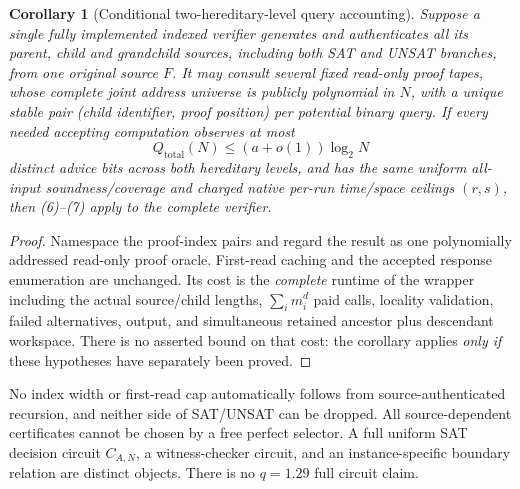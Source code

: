 \documentclass[11pt]{article}
\newtheorem{corollary}[theorem]{Corollary}
\begin{document}
\begin{corollary}[Conditional two-hereditary-level query accounting]
Suppose a \emph{single fully implemented} indexed
verifier generates and authenticates all its parent,
child and grandchild sources, including both SAT and
UNSAT branches, from one original source $F$.
It may consult several fixed read-only proof tapes,
whose \emph{complete joint address universe is
publicly polynomial in $N$}, with a unique stable
pair (child identifier, proof position) per
potential binary query. If every needed accepting
computation observes at most
\[
 Q_{\mathrm{total}}(N)\le(a+o(1))\log_2N
\]
\emph{distinct} advice bits \emph{across both
hereditary levels}, and has the same uniform all-input
soundness/coverage and charged native per-run
time/space ceilings $(r,s)$, then (6)--(7)
apply to the complete verifier.
\end{corollary}
\begin{proof}
Namespace the proof-index pairs and regard the
result as one polynomially addressed read-only
proof oracle. First-read caching and the accepted
response enumeration are unchanged. Its cost
is the \emph{complete} runtime of the wrapper
including the actual source/child lengths,
\(\sum_i m_i^d\) paid calls, locality validation,
failed alternatives, output, and simultaneous
retained ancestor plus descendant workspace.
There is no asserted bound on that cost: the
corollary applies \emph{only if} these hypotheses
have separately been proved.
\end{proof}
No index width or first-read cap automatically follows
from source-authenticated recursion, and neither
side of SAT/UNSAT can be dropped.
All source-dependent certificates cannot be
chosen by a free perfect selector.
A full uniform SAT decision circuit
$C_{A,N}$, a witness-checker circuit, and an
instance-specific boundary relation are distinct
objects. There is no $q=1.29$ full circuit
claim.
\end{document}
